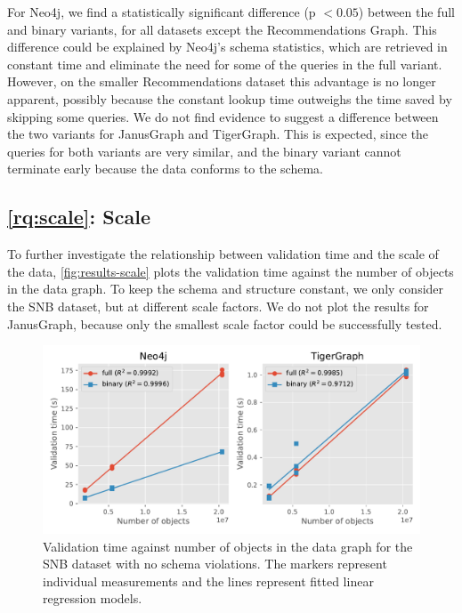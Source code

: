 \documentclass{report}
\theoremstyle{definition}
\begin{document}
For Neo4j, we find a statistically significant difference (p $< 0.05$) between the full and binary variants, for all datasets except the Recommendations Graph. This difference could be explained by Neo4j's schema statistics, which are retrieved in constant time and eliminate the need for some of the queries in the full variant. However, on the smaller Recommendations dataset this advantage is no longer apparent, possibly because the constant lookup time outweighs the time saved by skipping some queries. We do not find evidence to suggest a difference between the two variants for JanusGraph and TigerGraph. This is expected, since the queries for both variants are very similar, and the binary variant cannot terminate early because the data conforms to the schema.

\subsection{\ref*{rq:scale}: Scale}

To further investigate the relationship between validation time and the scale of the data, \autoref{fig:results-scale} plots the validation time against the number of objects in the data graph. To keep the schema and structure constant, we only consider the SNB dataset, but at different scale factors. We do not plot the results for JanusGraph, because only the smallest scale factor could be successfully tested.

\begin{figure}[t]
  \centering
  \includegraphics[scale=0.5]{figures/results-scale.pdf}
  \caption[Validation time against number of objects in the data graph]{Validation time against number of objects in the data graph for the SNB dataset with no schema violations. The markers represent individual measurements and the lines represent fitted linear regression models.}
  \label{fig:results-scale}
\end{figure}
\end{document}
